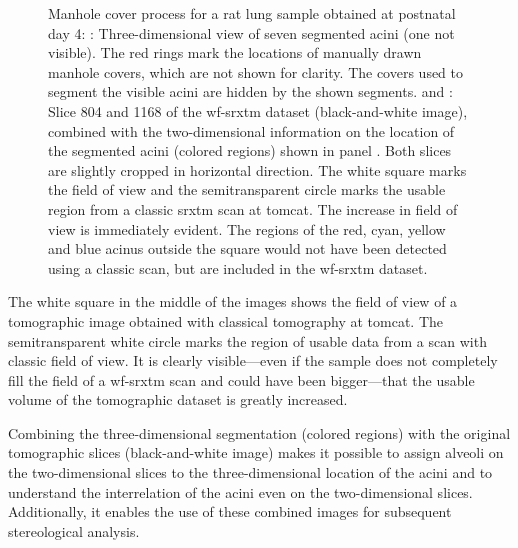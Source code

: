 \begin{figure}[htb]
{{%
			\label{subfig:manhole-1168}%
		}%
	}%
	\caption[Manhole cover process]{Manhole cover process for a rat lung sample obtained at postnatal day 4: : Three-dimensional view of seven segmented acini (one not visible). The red rings mark the locations of manually drawn manhole covers, which are not shown for clarity. The covers used to segment the visible acini are hidden by the shown segments.  and : Slice 804 and 1168 of the \ac{wf-srxtm} dataset (black-and-white  image), combined with the two-dimensional information on the location of the segmented acini (colored regions) shown in panel . Both slices are slightly cropped in horizontal direction. The white square marks the field of view and the semitransparent circle marks the usable region from a classic \ac{srxtm} scan at \ac{tomcat}. The increase in field of view is immediately evident. The regions of the red, cyan, yellow and blue acinus outside the square would not have been detected using a classic scan, but are included in the \ac{wf-srxtm} dataset.}
	\label{fig:manhole cover}%
\end{figure}%

The white square in the middle of the images shows the field of view of a tomographic image obtained with classical tomography at \ac{tomcat}. The semitransparent white circle marks the region of usable data from a scan with classic field of view. It is clearly visible---even if the sample does not completely fill the field of a \ac{wf-srxtm} scan and could have been bigger---that the usable volume of the tomographic dataset is greatly increased.

Combining the three-dimensional segmentation (colored regions) with the original tomographic slices (black-and-white image) makes it possible to assign alveoli on the two-dimensional slices to the three-dimensional location of the acini and to understand the interrelation of the acini even on the two-dimensional slices. Additionally, it enables the use of these combined images for subsequent stereological analysis.


